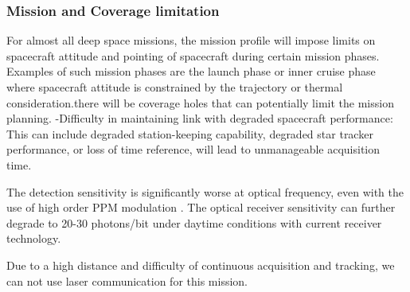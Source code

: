 \subsubsection{Mission and Coverage limitation}

For almost all deep space missions, the mission profile will impose limits on spacecraft attitude and pointing of spacecraft during certain mission phases. Examples of such mission phases are the launch phase or inner cruise phase where spacecraft attitude is constrained by the trajectory or thermal consideration.there will be coverage holes that can potentially limit the mission planning.
-Difficulty in maintaining link with degraded spacecraft performance: This can include degraded station-keeping capability, degraded star tracker performance, or loss of time reference, will lead to unmanageable acquisition time.

The detection sensitivity is significantly worse at optical frequency, even with the use of high order PPM modulation . The optical receiver sensitivity can further degrade to 20-30 photons/bit under daytime conditions with current receiver technology.

Due to a high distance and difficulty of continuous acquisition and tracking, we can not use laser communication for this mission.
